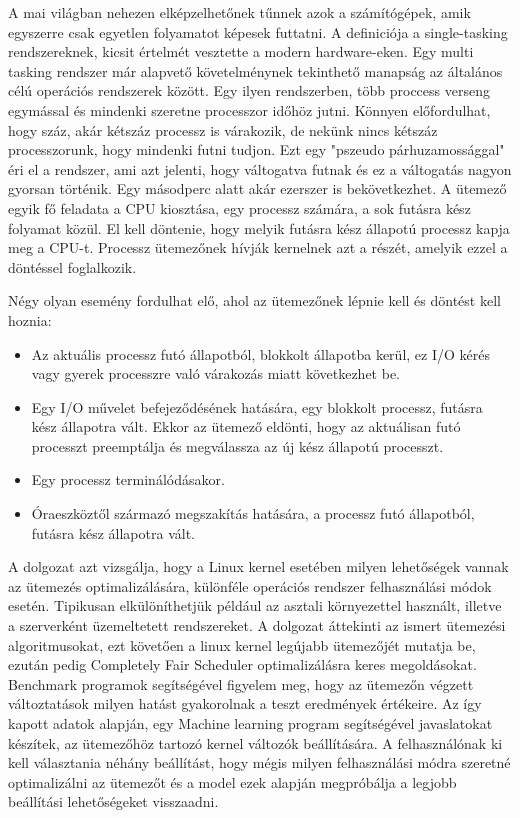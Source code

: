 
A mai világban nehezen elképzelhetőnek tűnnek azok a számítógépek, amik egyszerre csak egyetlen folyamatot képesek futtatni.
A definiciója a single-tasking rendszereknek, kicsit értelmét vesztette a modern hardware-eken. Egy multi tasking rendszer már alapvető követelménynek tekinthető manapság az általános célú operációs rendszerek között. Egy ilyen rendszerben, több proccess verseng egymással és mindenki szeretne processzor időhöz jutni. Könnyen előfordulhat, hogy száz, akár kétszáz processz is várakozik, de nekünk nincs kétszáz processzorunk, hogy mindenki futni tudjon. Ezt egy "pszeudo párhuzamossággal" éri el a rendszer, ami azt jelenti, hogy váltogatva futnak és ez a váltogatás nagyon gyorsan történik. Egy másodperc alatt akár ezerszer is bekövetkezhet.
A ütemező egyik fő feladata a CPU kiosztása, egy processz számára, a sok futásra kész folyamat közül. El kell döntenie, hogy melyik futásra kész állapotú processz kapja meg a CPU-t.
Processz ütemezőnek hívják kernelnek azt a részét, amelyik ezzel a döntéssel foglalkozik.

Négy olyan esemény fordulhat elő, ahol az ütemezőnek lépnie kell és döntést kell hoznia:
\begin{itemize}
  \item Az aktuális processz futó állapotból, blokkolt állapotba kerül, ez I/O kérés vagy gyerek processzre való várakozás miatt következhet be.
  \item Egy I/O művelet befejeződésének hatására, egy blokkolt processz, futásra kész állapotra vált. Ekkor az ütemező eldönti, hogy az aktuálisan futó processzt preemptálja és megválassza az új kész állapotú processzt.
  \item Egy processz terminálódásakor.
  \item Óraeszköztől származó megszakítás hatására, a processz futó állapotból, futásra kész állapotra vált. 
\end{itemize}

A dolgozat azt vizsgálja, hogy a Linux kernel esetében milyen lehetőségek vannak az ütemezés optimalizálására, különféle operációs rendszer felhasználási módok esetén. Tipikusan elkülöníthetjük például az asztali környezettel használt, illetve a szerverként üzemeltetett rendszereket. A dolgozat áttekinti az ismert ütemezési algoritmusokat, ezt követően a linux kernel legújabb ütemezőjét mutatja be, ezután pedig Completely Fair Scheduler optimalizálásra keres megoldásokat. Benchmark programok segítségével figyelem meg, hogy az ütemezőn végzett változtatások milyen hatást gyakorolnak a teszt eredmények értékeire.
Az így kapott adatok alapján, egy Machine learning program segítségével javaslatokat készítek, az ütemezőhöz tartozó kernel változók beállítására. A felhasználónak ki kell választania néhány beállítást, hogy mégis milyen felhasználási módra szeretné optimalizálni az ütemezőt és a model ezek alapján megpróbálja a legjobb beállítási lehetőségeket visszaadni. 
